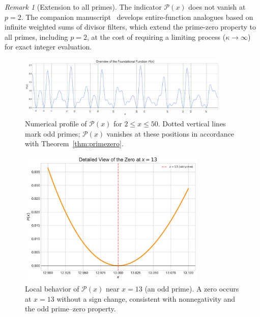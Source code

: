 \documentclass[11pt,a4paper]{amsart}
\theoremstyle{plain}
\theoremstyle{definition}
\theoremstyle{remark}
\newtheorem{remark}[theorem]{Remark}
\begin{document}
\begin{remark}[Extension to all primes]
The indicator $\mathcal{P}(x)$ does not vanish at $p=2$. The companion manuscript~\cite{fuchs2025-fejer} develops entire-function analogues based on infinite weighted sums of divisor filters, which extend the prime-zero property to all primes, including $p=2$, at the cost of requiring a limiting process ($\kappa\to\infty$) for exact integer evaluation.
\end{remark}

\begin{figure}[!htbp]
\centering
\includegraphics[width=0.9\textwidth]{plot_overview.pdf}
\caption{Numerical profile of $\mathcal{P}(x)$ for $2\le x\le 50$.
Dotted vertical lines mark odd primes;
$\mathcal{P}(x)$ vanishes at these positions in accordance with Theorem~\ref{thm:primezero}.}
\label{fig:overview}
\end{figure}

\begin{figure}[!htbp]
\centering
\includegraphics[width=0.8\textwidth]{plot_zoom_13.pdf}
\caption{Local behavior of $\mathcal{P}(x)$ near $x=13$ (an odd prime).
A zero occurs at $x=13$ without a sign change, consistent with nonnegativity and the odd prime–zero property.}
\label{fig:zoom13}
\end{figure}

\FloatBarrier

\end{document}
